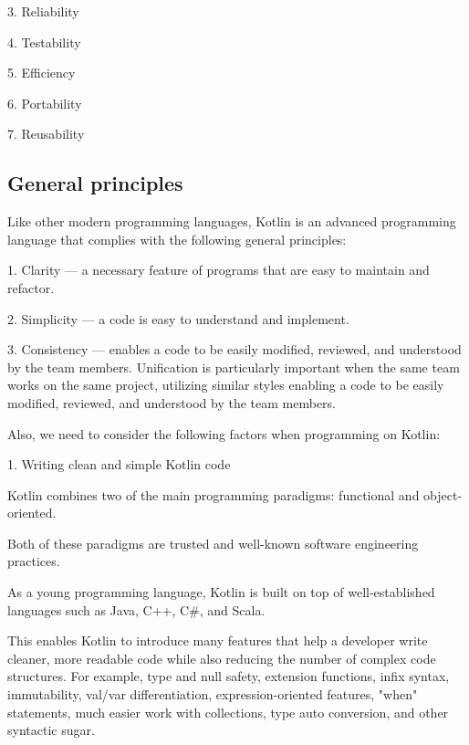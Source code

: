 3.	Reliability

4.	Testability

5.	Efficiency

6.	Portability

7.	Reusability





\subsection*{\textbf{General principles}}

\label{sec:}



Like other modern programming languages, Kotlin is an advanced programming language that complies with the following general principles:

1.	Clarity — a necessary feature of programs that are easy to maintain and refactor.

2.	Simplicity — a code is easy to understand and implement.

3.	Consistency — enables a code to be easily modified, reviewed, and understood by the team members. Unification is particularly important when the same team works on the same project, utilizing similar styles enabling a code to be easily modified, reviewed, and understood by the team members.



Also, we need to consider the following factors when programming on Kotlin:



1. Writing clean and simple Kotlin code



    Kotlin combines two of the main programming paradigms: functional and object-oriented.

    Both of these paradigms are trusted and well-known software engineering practices.

    As a young programming language, Kotlin is built on top of well-established languages such as Java, C++, C\#, and Scala.

    This enables Kotlin to introduce many features that help a developer write cleaner, more readable code while also reducing the number of complex code structures. For example, type and null safety, extension functions, infix syntax, immutability, val/var differentiation, expression-oriented features, "when" statements, much easier work with collections, type auto conversion, and other syntactic sugar.




